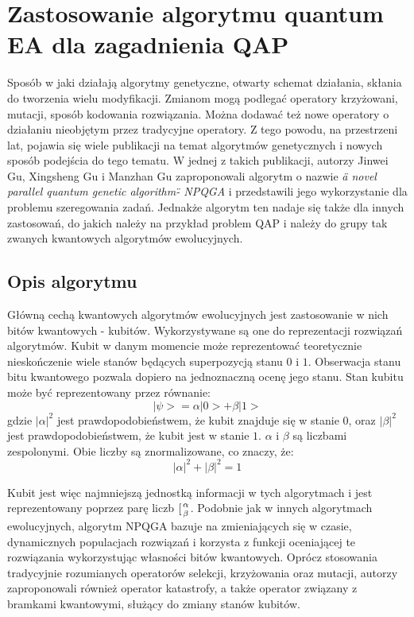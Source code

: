 \chapter{Zastosowanie algorytmu quantum EA dla zagadnienia QAP}
\label{cha:qap_ea}
Sposób w jaki działają algorytmy genetyczne, otwarty schemat działania, skłania do tworzenia wielu modyfikacji. Zmianom mogą podlegać operatory krzyżowani, mutacji, sposób kodowania rozwiązania. Można dodawać też nowe operatory o działaniu nieobjętym przez tradycyjne operatory. Z tego powodu, na przestrzeni lat, pojawia się wiele publikacji na temat algorytmów genetycznych i nowych sposób podejścia do tego tematu. W jednej z takich publikacji, autorzy Jinwei Gu, Xingsheng Gu i Manzhan Gu zaproponowali algorytm o nazwie \textit{\"a novel parallel quantum genetic algorithm\" - NPQGA} i przedstawili jego wykorzystanie dla problemu szeregowania zadań. Jednakże algorytm ten nadaje się także dla innych zastosowań, do jakich należy na przykład problem QAP i należy do grupy tak zwanych kwantowych algorytmów ewolucyjnych.

\section{Opis algorytmu}
Główną cechą kwantowych algorytmów ewolucyjnych jest zastosowanie w nich bitów kwantowych - kubitów. Wykorzystywane są one do reprezentacji rozwiązań algorytmów. Kubit w danym momencie może reprezentować teoretycznie nieskończenie wiele stanów będących superpozycją stanu $0$ i $1$. Obserwacja stanu bitu kwantowego pozwala dopiero na jednoznaczną ocenę jego stanu. Stan kubitu może być reprezentowany przez równanie:
\newline
\begin{equation}
|\psi>=\alpha|0>+\beta|1>
\end{equation}
\newline
gdzie $|\alpha|^2$ jest prawdopodobieństwem, że kubit znajduje się w stanie $0$, oraz $|\beta|^2$ jest prawdopodobieństwem, że kubit jest w stanie $1$. $\alpha$ i $\beta$ są liczbami zespolonymi. Obie liczby są znormalizowane, co znaczy, że:
\newline
\begin{equation}
|\alpha|^2+|\beta|^2=1
\end{equation}
\newline 

Kubit jest więc najmniejszą jednostką informacji w tych algorytmach i jest reprezentowany poprzez parę liczb $[{\alpha \atop \beta}$. Podobnie jak w innych algorytmach ewolucyjnych, algorytm NPQGA bazuje na zmieniających się w czasie, dynamicznych populacjach rozwiązań i korzysta z funkcji oceniającej te rozwiązania wykorzystując własności bitów kwantowych. Oprócz stosowania tradycyjnie rozumianych operatorów selekcji, krzyżowania oraz mutacji, autorzy zaproponowali również operator katastrofy, a także operator związany z bramkami kwantowymi, służący do zmiany stanów kubitów.

